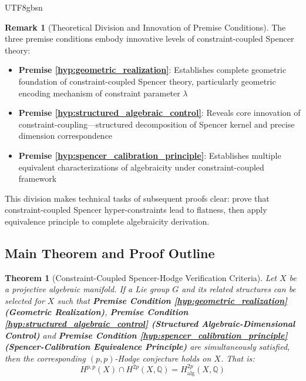 \documentclass[a4paper,12pt]{extarticle}
\newtheorem{theorem}{Theorem}[section]
\theoremstyle{definition}
\newtheorem{remark}{Remark}[section]
\begin{document}
\begin{CJK}{UTF8}{gbsn}
\begin{remark}[Theoretical Division and Innovation of Premise Conditions]
The three premise conditions embody innovative levels of constraint-coupled Spencer theory:
\begin{itemize}
    \item \textbf{Premise \ref{hyp:geometric_realization}}: Establishes complete geometric foundation of constraint-coupled Spencer theory, particularly geometric encoding mechanism of constraint parameter $\lambda$
    \item \textbf{Premise \ref{hyp:structured_algebraic_control}}: Reveals core innovation of constraint-coupling—structured decomposition of Spencer kernel and precise dimension correspondence
    \item \textbf{Premise \ref{hyp:spencer_calibration_principle}}: Establishes multiple equivalent characterizations of algebraicity under constraint-coupled framework
\end{itemize}
This division makes technical tasks of subsequent proofs clear: prove that constraint-coupled Spencer hyper-constraints lead to flatness, then apply equivalence principle to complete algebraicity derivation.
\end{remark}

\subsection{Main Theorem and Proof Outline}
\label{subsec:main_theorem_and_proof_outline}

\begin{theorem}[Constraint-Coupled Spencer-Hodge Verification Criteria]
\label{thm:main_criterion_final}
Let $X$ be a projective algebraic manifold. If a Lie group $G$ and its related structures can be selected for $X$ such that \textbf{Premise Condition \ref{hyp:geometric_realization} (Geometric Realization)}, \textbf{Premise Condition \ref{hyp:structured_algebraic_control} (Structured Algebraic-Dimensional Control)} and \textbf{Premise Condition \ref{hyp:spencer_calibration_principle} (Spencer-Calibration Equivalence Principle)} are simultaneously satisfied, then the corresponding $(p,p)$-Hodge conjecture holds on $X$. That is:
\begin{equation}
\label{eq:hodge_conjecture_conclusion}
H^{p,p}(X) \cap H^{2p}(X, \mathbb{Q}) = H_{\text{alg}}^{2p}(X, \mathbb{Q})
\end{equation}
\end{theorem}


\end{CJK}
\end{document}
